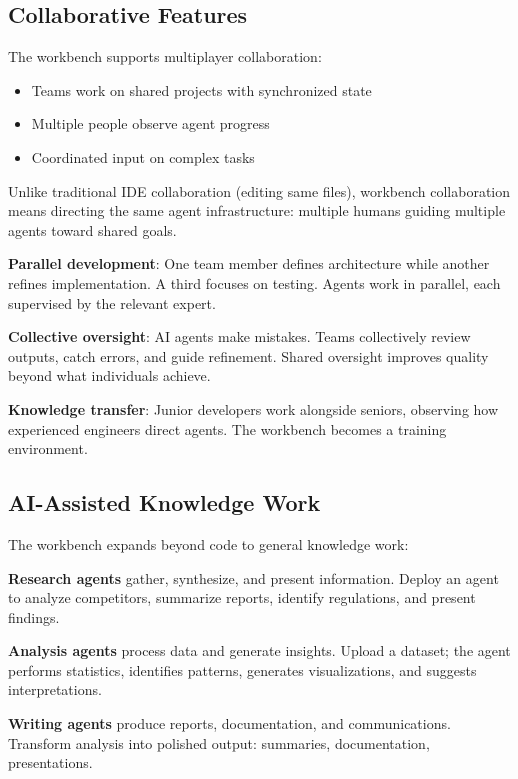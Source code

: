 \documentclass[11pt,a4paper]{article}
\begin{document}
\subsection{Collaborative Features}

The workbench supports multiplayer collaboration:

\begin{itemize}[noitemsep]
    \item Teams work on shared projects with synchronized state
    \item Multiple people observe agent progress
    \item Coordinated input on complex tasks
\end{itemize}

Unlike traditional IDE collaboration (editing same files), workbench collaboration means directing the same agent infrastructure: multiple humans guiding multiple agents toward shared goals.

\textbf{Parallel development}: One team member defines architecture while another refines implementation. A third focuses on testing. Agents work in parallel, each supervised by the relevant expert.

\textbf{Collective oversight}: AI agents make mistakes. Teams collectively review outputs, catch errors, and guide refinement. Shared oversight improves quality beyond what individuals achieve.

\textbf{Knowledge transfer}: Junior developers work alongside seniors, observing how experienced engineers direct agents. The workbench becomes a training environment.

\subsection{AI-Assisted Knowledge Work}

The workbench expands beyond code to general knowledge work:

\textbf{Research agents} gather, synthesize, and present information. Deploy an agent to analyze competitors, summarize reports, identify regulations, and present findings.

\textbf{Analysis agents} process data and generate insights. Upload a dataset; the agent performs statistics, identifies patterns, generates visualizations, and suggests interpretations.

\textbf{Writing agents} produce reports, documentation, and communications. Transform analysis into polished output: summaries, documentation, presentations.
\end{document}
